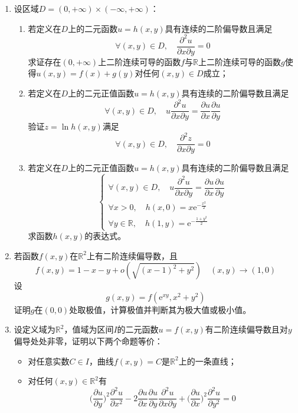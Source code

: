 \documentclass[a4paper,UTF8,fontset=windows,AutoFakeBold]{ctexart}
\newcommand*{\er}{\mathrm{e}}
\newcommand*{\rb}{\mathbb{R}}
\theoremstyle{ex}
\begin{document}
\begin{enumerate}
    \item 设区域$D=(0,+\infty)\times(-\infty,+\infty)$：
    \begin{enumerate}
        \item 若定义在$D$上的二元函数$u=h(x,y)$具有连续的二阶偏导数且满足
        $$\forall(x,y)\in D,\quad\frac{\partial^2u}{\partial x\partial y}=0$$
        求证存在$(0,+\infty)$上二阶连续可导的函数$f$与$\rb$上二阶连续可导的函数$g$使得$u(x,y)=f(x)+g(y)$对任何$(x,y)\in D$成立；
        \item 若定义在$D$上的二元正值函数$u=h(x,y)$具有连续的二阶偏导数且满足
        $$\forall(x,y)\in D,\quad u\frac{\partial^2u}{\partial x\partial y}=\frac{\partial u}{\partial x}\frac{\partial u}{\partial y}$$
        验证$z=\ln h(x,y)$满足
        $$\forall(x,y)\in D,\quad\frac{\partial^2z}{\partial x\partial y}=0$$
        \item 若定义在$D$上的二元正值函数$u=h(x,y)$具有连续的二阶偏导数且满足
        $$\begin{cases}\forall(x,y)\in D,\quad u\dfrac{\partial^2u}{\partial x\partial y}=\dfrac{\partial u}{\partial x}\dfrac{\partial u}{\partial y}\\\forall x>0,\quad h(x,0)=x\er^{-\frac{x^2}{2}}\\\forall y\in\rb,\quad h(1,y)=\er^{-\frac{1+y^2}{2}}\end{cases}$$
        求函数$h(x,y)$的表达式。
    \end{enumerate}

    \item 若函数$f(x,y)$在$\rb^2$上有二阶连续偏导数，且
    $$f(x,y)=1-x-y+o(\sqrt{(x-1)^2+y^2})\quad (x,y)\to(1,0)$$
    设
    $$g(x,y)=f(\er^{xy},x^2+y^2)$$
    证明$g$在$(0,0)$处取极值，计算极值并判断其为极大值或极小值。

    \item 设定义域为$\rb^2$，值域为区间$I$的二元函数$u=f(x,y)$有二阶连续偏导数且对$y$偏导处处非零，证明以下两个命题等价：
    \begin{itemize}
        \item 对任意实数$C\in I$，曲线$f(x,y)=C$是$\rb^2$上的一条直线；
        \item 对任何$(x,y)\in\rb^2$有
        $$\bigg(\frac{\partial u}{\partial y}\bigg)^2\frac{\partial^2u}{\partial x^2}-2\frac{\partial u}{\partial x}\frac{\partial u}{\partial y}\frac{\partial^2u}{\partial x\partial y}+\bigg(\frac{\partial u}{\partial x}\bigg)^2\frac{\partial^2u}{\partial y^2}=0$$
    \end{itemize}
\end{enumerate}
\end{document}
